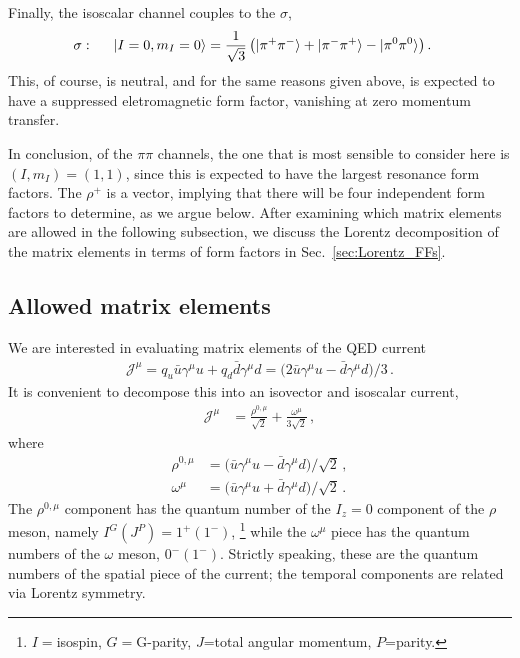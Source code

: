 Finally, the isoscalar channel couples to the $\sigma$,
\begin{align}
\sigma:\hspace{.5cm}|I=0,m_I=0\rangle&=\frac{1}{\sqrt{3}}\left(|\pi^+\pi^-\rangle+|\pi^-\pi^+\rangle-|\pi^0\pi^0\rangle\right).
\end{align}
This, of course, is neutral, and for the same reasons given above, is expected to have a suppressed eletromagnetic form factor, vanishing at zero momentum transfer.

In conclusion, of the $\pi\pi$ channels, the one that is most sensible to consider here is $(I,m_I)=(1,1)$, since this is expected to have the largest resonance form factors. The $\rho^+$ is a vector, implying that there will be four independent form factors to determine, as we argue below.
%
{} 
%
After examining which matrix elements are allowed in the following subsection, we discuss the Lorentz decomposition of the matrix elements in terms of form factors in Sec.~\ref{sec:Lorentz_FFs}.

 \subsection{Allowed matrix elements}

We are interested in evaluating matrix elements of the QED current
\begin{align}
{\mathcal{J}}^{\mu}=q_u\bar{u}\gamma^\mu u+q_d\bar{d}\gamma^\mu d= \big (2\bar{u}\gamma^\mu u-\bar{d}\gamma^\mu d \big )/3 \,.
\end{align} 
It is convenient to decompose this into an isovector and isoscalar current, 
\begin{align}
{\mathcal{J}}^{\mu}&=\frac{ \rho^{0,\mu}}{\sqrt{2}}+\frac{\omega^{\mu}}{3\sqrt{2}} \,,
\end{align}
where
\begin{align}
\rho^{0,\mu}&= \big ( \bar{u}\gamma^\mu u-\bar{d}\gamma^\mu d \big )/\sqrt{2} \,,\\
\omega^{\mu}&= \big (\bar{u}\gamma^\mu u+\bar{d}\gamma^\mu d \big )/\sqrt{2} \,.
\end{align} 
The $\rho^{0,\mu}$ component has the quantum number of the $I_z=0$ component of the $\rho$ meson, namely $I^G(J^{P})=1^{+}(1^{-})$,%
\footnote{$I=$isospin, $G=$G-parity, $J$=total angular momentum, $P$=parity.}
while the $\omega^{\mu}$ piece has the quantum numbers of the $\omega$ meson, $0^{-}(1^{-})$. Strictly speaking, these are the quantum numbers of the spatial piece of the current; the temporal components are related via Lorentz symmetry. 


